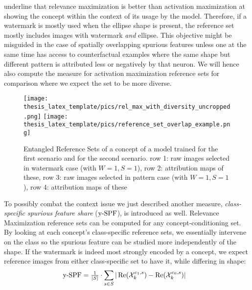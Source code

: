 \citet{Achtibat2022} underline that relevance maximization is better than activation maximization at showing the concept within the context of its usage by the model. Therefore, if a watermark is mostly used when the ellipse shape is present, the reference set mostly includes images with watermark \textit{and} ellipse. This objective might be misguided in the case of spatially overlapping spurious features unless one at the same time has access to counterfactual examples where the same shape but different pattern is attributed less or negatively by that neuron. We will hence also compute the measure for activation maximization reference sets for comparison where we expect the set to be more diverse. 

\begin{figure}[t!]
    \centering
    \texttt{[image: thesis\_latex\_template/pics/rel\_max\_with\_diversity\_uncropped.png]}
    \texttt{[image: thesis\_latex\_template/pics/reference\_set\_overlap\_example.png]}
    \caption[Entangled Reference Sets]{Entangled Reference Sets of a concept of a model trained for the first scenario and for the second scenario.
    row 1: raw images selected in watermark case (with $W=1, S=1$), row 2: attribution maps of these, 
    row 3: raw images selected in pattern case (with $W=1, S=1$), row 4: attribution maps of these}
    \label{fig:entangled_ref_set}
\end{figure}

To possibly combat the context issue we just described another measure, \textit{class-specific spurious feature share} ($\operatorname*{y-SPF}$), is introduced as well. 
Relevance Maximization reference sets can be computed for any concept-conditioning set. 
By looking at each concept's class-specific reference sets, we essentially intervene on the class so the spurious feature can be studied more independently of the shape. If the watermark is indeed most strongly encoded by a concept, we expect reference images from either class-specific set to have it, while differing in shape:
\begin{align}\displaystyle
& \operatorname*{y-SPF} =\tfrac{1}{|S|} \cdot
\sum_{s \in S} | \operatorname*{Re}(\mathcal{X}_k^{c_1, s}) - \operatorname*{Re}(\mathcal{X}_k^{c_0, s})| & 
\end{align}

